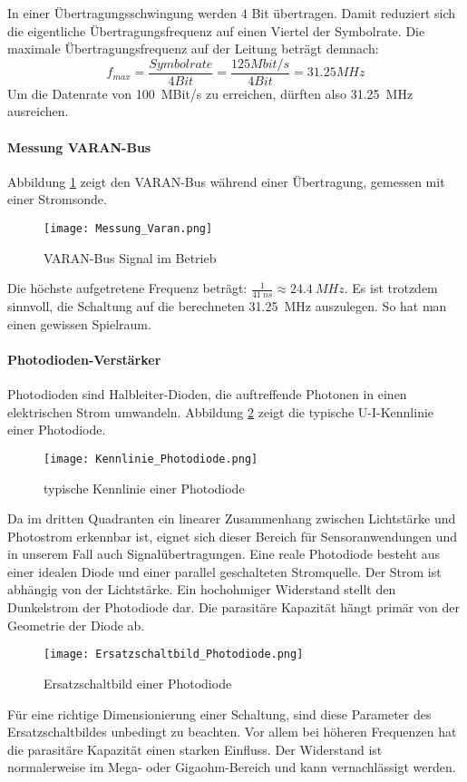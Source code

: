 In einer Übertragungsschwingung werden 4 Bit übertragen. Damit reduziert sich die eigentliche Übertragungsfrequenz auf einen Viertel der Symbolrate. Die maximale Übertragungsfrequenz auf der Leitung beträgt demnach: 
\begin{equation}\label{eq:MLT3}
f_{max}=\frac{Symbolrate}{4 Bit}=\frac{125Mbit/s}{4 Bit}=31.25 MHz
\end{equation}
Um die Datenrate von \SI{100}{MBit/s} zu erreichen, dürften also \SI{31.25}{MHz} ausreichen.

\paragraph{Messung VARAN-Bus}
Abbildung \ref{fig:Messung_Varan} zeigt den VARAN-Bus während einer Übertragung, gemessen mit einer Stromsonde.
\begin{figure}[H]
	\centering
	\texttt{[image: Messung\_Varan.png]}
	\caption{VARAN-Bus Signal im Betrieb}\label{fig:Messung_Varan}
\end{figure}
Die höchste aufgetretene Frequenz beträgt: $\frac{1}{\SI{41}{ns}}\approx \SI{24.4}{MHz}$. Es ist trotzdem sinnvoll, die Schaltung auf die berechneten \SI{31.25}{MHz} auszulegen. So hat man einen gewissen Spielraum.

\paragraph{Photodioden-Verstärker}
Photodioden sind Halbleiter-Dioden, die auftreffende Photonen in einen elektrischen Strom umwandeln. Abbildung \ref{fig:Kenn_Photodiode} zeigt die typische U-I-Kennlinie einer Photodiode.
\begin{figure}[h]
	\centering
	\texttt{[image: Kennlinie\_Photodiode.png]}
	\caption{typische Kennlinie einer Photodiode}\label{fig:Kenn_Photodiode}
\end{figure}
Da im dritten Quadranten ein linearer Zusammenhang zwischen Lichtstärke und Photostrom erkennbar ist, eignet sich dieser Bereich für Sensoranwendungen und in unserem Fall auch Signalübertragungen.
Eine reale Photodiode besteht aus einer idealen Diode und einer parallel geschalteten Stromquelle. Der Strom ist abhängig von der Lichtstärke. Ein hochohmiger Widerstand stellt den Dunkelstrom der Photodiode dar. Die parasitäre Kapazität hängt primär von der Geometrie der Diode ab.
 \begin{figure}[H]
 	\centering
 	\texttt{[image: Ersatzschaltbild\_Photodiode.png]}
 	\caption{Ersatzschaltbild einer Photodiode}\label{fig:Ersatz_Photodiode}
 \end{figure}
Für eine richtige Dimensionierung einer Schaltung, sind diese Parameter des Ersatzschaltbildes unbedingt zu beachten. Vor allem bei höheren Frequenzen hat die parasitäre Kapazität einen starken Einfluss. Der Widerstand ist normalerweise im Mega- oder Gigaohm-Bereich und kann vernachlässigt werden. \newline


